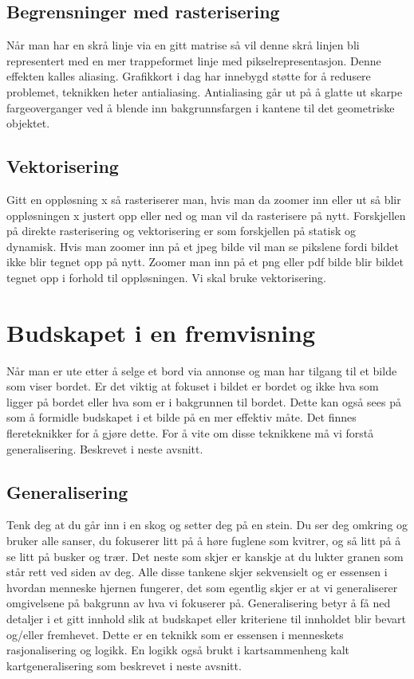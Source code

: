 \documentclass[norsk]{article}
\begin{document}
\subsection{Begrensninger med rasterisering}
Når man har en skrå linje via en gitt matrise så vil denne skrå linjen bli
representert med en mer trappeformet linje med pikselrepresentasjon. Denne
effekten kalles aliasing. Grafikkort i dag har innebygd støtte for å redusere
problemet, teknikken heter antialiasing. Antialiasing går ut på å glatte ut
skarpe fargeoverganger ved å blende inn bakgrunnsfargen i kantene til det
geometriske objektet.

\subsection{Vektorisering}
Gitt en oppløsning x så rasteriserer man, hvis man da zoomer inn eller ut så 
blir oppløsningen x justert opp eller ned og man vil da rasterisere på nytt.
Forskjellen på direkte rasterisering og vektorisering er som forskjellen på
statisk og dynamisk. Hvis man zoomer inn på et jpeg bilde vil man se pikslene
fordi bildet ikke blir tegnet opp på nytt. Zoomer man inn på et png eller pdf
bilde blir bildet tegnet opp i forhold til oppløsningen. Vi skal bruke
vektorisering.

\section{Budskapet i en fremvisning}
Når man er ute etter å selge et bord via annonse og man har tilgang til et bilde
som viser bordet. Er det viktig at fokuset i bildet er bordet og ikke hva som
ligger på bordet eller hva som er i bakgrunnen til bordet. Dette kan også sees på som å formidle budskapet i et bilde på en mer effektiv måte. Det finnes flereteknikker for å gjøre dette. For å vite om disse teknikkene må vi forstå
generalisering. Beskrevet i neste avsnitt.

\subsection{Generalisering}
Tenk deg at du går inn i en skog og setter deg på en stein. Du ser deg omkring
og bruker alle sanser, du fokuserer litt på å høre fuglene som kvitrer, og så
litt på å se litt på busker og trær. Det neste som skjer er kanskje at du
lukter granen som står rett ved siden av deg. Alle disse tankene skjer
sekvensielt og er essensen i hvordan menneske hjernen fungerer, det som egentlig
skjer er at vi generaliserer omgivelsene på bakgrunn av hva vi fokuserer på.
Generalisering betyr å få ned detaljer i et gitt innhold slik at budskapet
eller kriteriene til innholdet blir bevart og/eller fremhevet. Dette er en
teknikk som er essensen i menneskets rasjonalisering og logikk. En logikk 
også brukt i kartsammenheng kalt kartgeneralisering som beskrevet i neste avsnitt.
\end{document}
